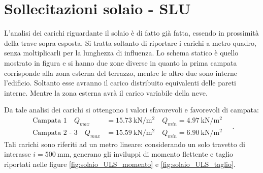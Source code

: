 		

\clearpage
\section{Sollecitazioni solaio - SLU}
L'analisi dei carichi riguardante il solaio è di fatto già fatta, essendo in prossimità della trave sopra esposta.
Si tratta soltanto di riportare i carichi a metro quadro, senza moltiplicarli per la lunghezza di influenza.
Lo schema statico è quello mostrato in figura e si hanno due zone diverse in quanto la prima campata corrisponde alla zona esterna del terrazzo, mentre le altro due sono interne l'edificio.
Soltanto esse avranno il carico distribuito equivalenti delle pareti interne.
Mentre la zona esterna avrà il carico variabile della neve.

Da tale analisi dei carichi si ottengono i valori sfavorevoli e favorevoli di campata:
\begin{equation}
	\begin{split}
	\text{Campata 1} \quad Q_{max} &= \SI{15.73}{\kilo\newton\per\metre\squared} \quad Q_{min} = \SI{4.97}{\kilo\newton\per\metre\squared} \\
	\text{Campata 2 - 3} \quad Q_{max} &= \SI{15.59}{\kilo\newton\per\metre\squared} \quad Q_{min} = \SI{6.90}{\kilo\newton\per\metre\squared}
	\end{split}\quad .
\end{equation}
Tali carichi sono riferiti ad un metro lineare: considerando un solo travetto di interasse $i = \SI{500}{\milli\metre}$, generano gli inviluppi di momento flettente e taglio riportati nelle figure \ref{fig:solaio_ULS_momento} e \ref{fig:solaio_ULS_taglio}.


